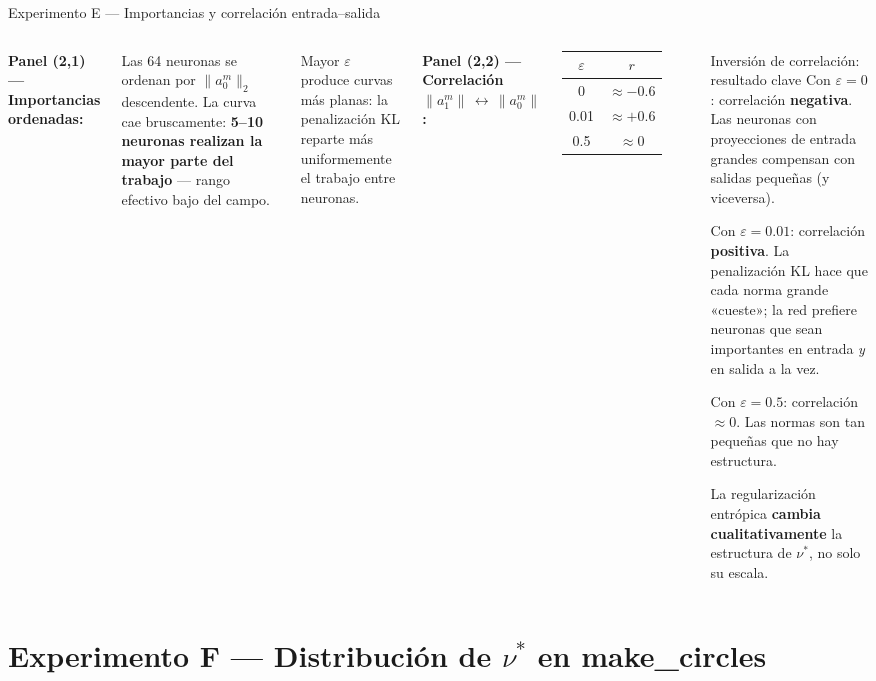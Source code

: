\documentclass[10pt]{beamer}
\begin{document}
\begin{frame}{Experimento E — Importancias y correlación entrada–salida}

\begin{columns}

\textbf{Panel (2,1) — Importancias ordenadas:}

Las 64 neuronas se ordenan por $\|a_0^m\|_2$ descendente. La curva cae bruscamente: \textbf{5--10 neuronas realizan la mayor parte del trabajo} — rango efectivo bajo del campo.

\medskip
Mayor $\varepsilon$ produce curvas más planas: la penalización KL reparte más uniformemente el trabajo entre neuronas.

\bigskip
\textbf{Panel (2,2) — Correlación $\|a_1^m\|\,\leftrightarrow\,\|a_0^m\|$:}

\begin{tabular}{cc}
  \toprule
  $\varepsilon$ & $r$ \\
  \midrule
  0 & $\approx -0.6$ \\
  0.01 & $\approx +0.6$ \\
  0.5 & $\approx 0$ \\
  \bottomrule
\end{tabular}

\begin{alertblock}{Inversión de correlación: resultado clave}
  Con \textbf{$\varepsilon=0$}: correlación \textbf{negativa}. Las neuronas con proyecciones de entrada grandes compensan con salidas pequeñas (y viceversa).

  \medskip
  Con \textbf{$\varepsilon=0.01$}: correlación \textbf{positiva}. La penalización KL hace que cada norma grande «cueste»; la red prefiere neuronas que sean importantes en entrada \emph{y} en salida a la vez.

  \medskip
  Con \textbf{$\varepsilon=0.5$}: correlación $\approx 0$. Las normas son tan pequeñas que no hay estructura.

  \medskip
  La regularización entrópica \textbf{cambia cualitativamente} la estructura de $\nu^*$, no solo su escala.
\end{alertblock}
\end{columns}

\end{frame}

\section{Experimento F — Distribución de $\nu^*$ en make\_circles}
\end{document}
